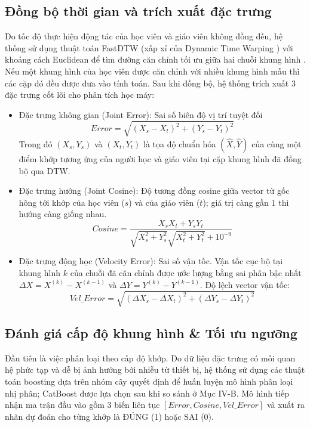 \documentclass[10pt,conference,a4paper]{IEEEtran}
\begin{document}
\subsection{Đồng bộ thời gian và trích xuất đặc trưng}
Do tốc độ thực hiện động tác của học viên và giáo viên không đồng đều, hệ thống sử dụng thuật toán FastDTW \cite{salvador2007fastdtw} (xấp xỉ của Dynamic Time Warping \cite{sakoe1978dtw}) với khoảng cách Euclidean để tìm đường căn chỉnh tối ưu giữa hai chuỗi khung hình \cite{article}. Nếu một khung hình của học viên được căn chỉnh với nhiều khung hình mẫu thì các cặp đó đều được đưa vào tính toán. Sau khi đồng bộ, hệ thống trích xuất 3 đặc trưng cốt lõi cho phân tích học máy:
\begin{itemize}
    \item Đặc trưng không gian (Joint Error): Sai số biên độ vị trí tuyệt đối
\begin{equation}
Error = \sqrt{(X_s - X_t)^2 + (Y_s - Y_t)^2}
\end{equation}
Trong đó $(X_s, Y_s)$ và $(X_t, Y_t)$ là tọa độ chuẩn hóa $(\hat{X}, \hat{Y})$ của cùng một điểm khớp tương ứng của người học và giáo viên tại cặp khung hình đã đồng bộ qua DTW.
    \item Đặc trưng hướng (Joint Cosine): Độ tương đồng cosine giữa vector từ gốc hông tới khớp của học viên ($s$) và của giáo viên ($t$); giá trị càng gần $1$ thì hướng càng giống nhau.
\begin{equation}
Cosine = \frac{X_s X_t + Y_s Y_t}{\sqrt{X_s^2 + Y_s^2} \sqrt{X_t^2 + Y_t^2} + 10^{-9}}
\end{equation}
    \item Đặc trưng động học (Velocity Error): Sai số vận tốc. Vận tốc cục bộ tại khung hình $k$ của chuỗi đã căn chỉnh được ước lượng bằng sai phân bậc nhất $\Delta X = X^{(k)} - X^{(k-1)}$ và $\Delta Y = Y^{(k)} - Y^{(k-1)}$. Độ lệch vector vận tốc:
\begin{equation}
Vel\_Error = \sqrt{(\Delta X_s - \Delta X_t)^2 + (\Delta Y_s - \Delta Y_t)^2}
\end{equation}
\end{itemize}

\subsection{Đánh giá cấp độ khung hình \& Tối ưu ngưỡng}

Đầu tiên là việc phân loại theo cấp độ khớp. Do dữ liệu đặc trưng có mối quan hệ phức tạp và dễ bị ảnh hưởng bởi nhiễu từ thiết bị, hệ thống sử dụng các thuật toán boosting dựa trên nhóm cây quyết định để huấn luyện mô hình phân loại nhị phân; CatBoost \cite{prokhorenkova2018catboost} được lựa chọn sau khi so sánh ở Mục IV-B.
Mô hình tiếp nhận ma trận đầu vào gồm 3 biến liên tục $[Error, Cosine, Vel\_Error]$ và xuất ra nhãn dự đoán cho từng khớp là ĐÚNG (1) hoặc SAI (0).
\end{document}
